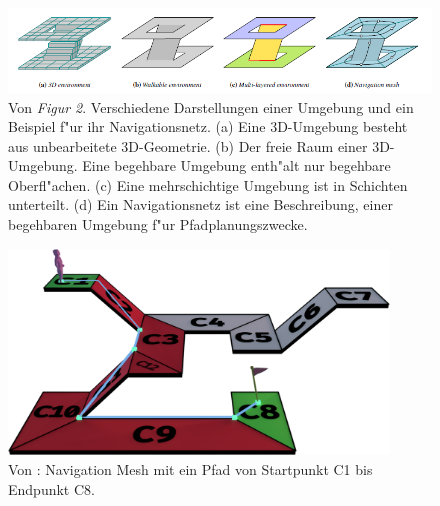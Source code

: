 \begin{figure}[H] %
	\centering
	\includegraphics[width=\textwidth]{images/navigation_mesh_16.png}
	\caption{Von \cite[~S. 93]{Mesh:16} \textit{Figur 2}. Verschiedene Darstellungen einer Umgebung und ein Beispiel f"ur ihr Navigationsnetz. (a) Eine 3D-Umgebung besteht aus unbearbeitete 3D-Geometrie. (b) Der freie Raum einer 3D-Umgebung. Eine begehbare Umgebung enth"alt nur begehbare Oberfl"achen. (c) Eine mehrschichtige Umgebung ist in Schichten unterteilt. (d) Ein Navigationsnetz ist eine Beschreibung, einer begehbaren Umgebung f"ur Pfadplanungszwecke.}
	\label{sec1a}
\end{figure}
\begin{figure}[H] %
	\centering
	\includegraphics[width=0.9\textwidth]{images/mesh_with_path.png}
	\caption{Von \cite{Mesh:18}: Navigation Mesh mit ein Pfad von Startpunkt C1 bis Endpunkt C8.}
	\label{sec1b}
\end{figure}


